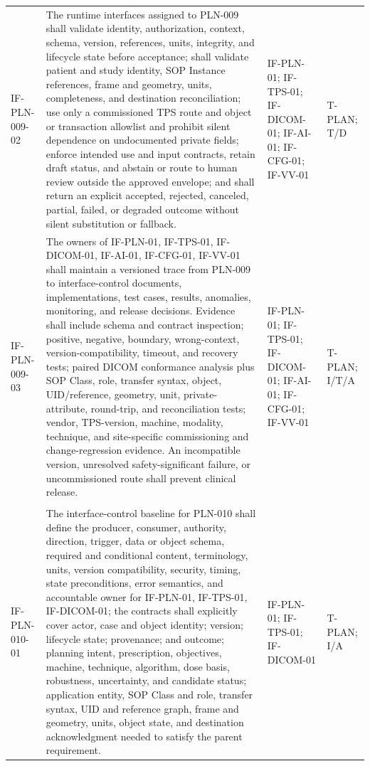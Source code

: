 \documentclass[11pt,letterpaper]{article}
\begin{document}
\begin{scriptsize}
\begin{longtable}{@{}L{0.14\textwidth}L{0.49\textwidth}L{0.19\textwidth}L{0.10\textwidth}@{}}
\addlinespace[2pt]
\mbox{IF-PLN-009-02} & The runtime interfaces assigned to PLN-009 shall validate identity, authorization, context, schema, version, references, units, integrity, and lifecycle state before acceptance; shall validate patient and study identity, SOP Instance references, frame and geometry, units, completeness, and destination reconciliation; use only a commissioned TPS route and object or transaction allowlist and prohibit silent dependence on undocumented private fields; enforce intended use and input contracts, retain draft status, and abstain or route to human review outside the approved envelope; and shall return an explicit accepted, rejected, canceled, partial, failed, or degraded outcome without silent substitution or fallback. & IF-PLN-01; IF-TPS-01; IF-DICOM-01; IF-AI-01; IF-CFG-01; IF-VV-01 & T-PLAN; T\slash\allowbreak{}D \\
\addlinespace[2pt]
\mbox{IF-PLN-009-03} & The owners of IF-PLN-01, IF-TPS-01, IF-DICOM-01, IF-AI-01, IF-CFG-01, IF-VV-01 shall maintain a versioned trace from PLN-009 to interface-control documents, implementations, test cases, results, anomalies, monitoring, and release decisions. Evidence shall include schema and contract inspection; positive, negative, boundary, wrong-context, version-compatibility, timeout, and recovery tests; paired DICOM conformance analysis plus SOP Class, role, transfer syntax, object, UID\slash\allowbreak{}reference, geometry, unit, private-attribute, round-trip, and reconciliation tests; vendor, TPS-version, machine, modality, technique, and site-specific commissioning and change-regression evidence. An incompatible version, unresolved safety-significant failure, or uncommissioned route shall prevent clinical release. & IF-PLN-01; IF-TPS-01; IF-DICOM-01; IF-AI-01; IF-CFG-01; IF-VV-01 & T-PLAN; I\slash\allowbreak{}T\slash\allowbreak{}A \\
\addlinespace[2pt]
 \\
\addlinespace[2pt]
\mbox{IF-PLN-010-01} & The interface-control baseline for PLN-010 shall define the producer, consumer, authority, direction, trigger, data or object schema, required and conditional content, terminology, units, version compatibility, security, timing, state preconditions, error semantics, and accountable owner for IF-PLN-01, IF-TPS-01, IF-DICOM-01; the contracts shall explicitly cover actor, case and object identity; version; lifecycle state; provenance; and outcome; planning intent, prescription, objectives, machine, technique, algorithm, dose basis, robustness, uncertainty, and candidate status; application entity, SOP Class and role, transfer syntax, UID and reference graph, frame and geometry, units, object state, and destination acknowledgment needed to satisfy the parent requirement. & IF-PLN-01; IF-TPS-01; IF-DICOM-01 & T-PLAN; I\slash\allowbreak{}A \\

\end{longtable}
\end{scriptsize}
\end{document}
